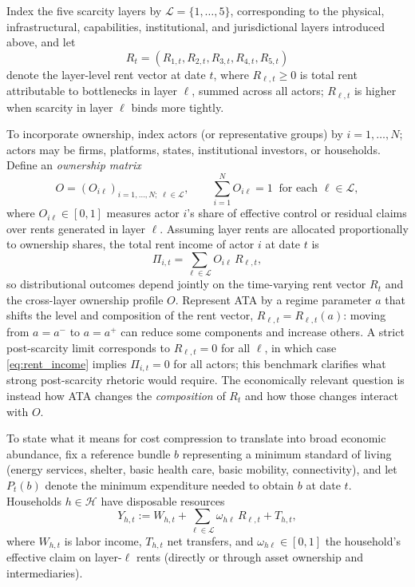 \documentclass[11pt]{article}
\begin{document}
Index the five scarcity layers by \(\mathcal{L}=\{1,\dots,5\}\), corresponding to the physical, infrastructural, capabilities, institutional, and jurisdictional layers introduced above, and let
\begin{equation}
R_t=(R_{1,t},R_{2,t},R_{3,t},R_{4,t},R_{5,t})
\label{eq:rent_vector}
\end{equation}
denote the layer-level rent vector at date \(t\), where \(R_{\ell,t}\ge 0\) is total rent attributable to bottlenecks in layer \(\ell\), summed across all actors; \(R_{\ell,t}\) is higher when scarcity in layer \(\ell\) binds more tightly.

To incorporate ownership, index actors (or representative groups) by \(i=1,\dots,N\); actors may be firms, platforms, states, institutional investors, or households. Define an \emph{ownership matrix}
\begin{equation}
O=(O_{i\ell})_{i=1,\dots,N;\;\ell\in\mathcal{L}},
\qquad
\sum_{i=1}^N O_{i\ell}=1 \ \text{ for each } \ell\in\mathcal{L},
\label{eq:ownership_matrix}
\end{equation}
where \(O_{i\ell}\in[0,1]\) measures actor \(i\)'s share of effective control or residual claims over rents generated in layer \(\ell\). Assuming layer rents are allocated proportionally to ownership shares, the total rent income of actor \(i\) at date \(t\) is
\begin{equation}
\Pi_{i,t}=\sum_{\ell\in\mathcal{L}} O_{i\ell}\,R_{\ell,t},
\label{eq:rent_income}
\end{equation}
so distributional outcomes depend jointly on the time-varying rent vector \(R_t\) and the cross-layer ownership profile \(O\). Represent ATA by a regime parameter \(a\) that shifts the level and composition of the rent vector, \(R_{\ell,t}=R_{\ell,t}(a)\): moving from \(a=a^-\) to \(a=a^+\) can reduce some components and increase others. A strict post-scarcity limit corresponds to \(R_{\ell,t}=0\) for all \(\ell\), in which case \eqref{eq:rent_income} implies \(\Pi_{i,t}=0\) for all actors; this benchmark clarifies what strong post-scarcity rhetoric would require. The economically relevant question is instead how ATA changes the \emph{composition} of \(R_t\) and how those changes interact with \(O\).

To state what it means for cost compression to translate into broad economic abundance, fix a reference bundle \(b\) representing a minimum standard of living (energy services, shelter, basic health care, basic mobility, connectivity), and let \(P_t(b)\) denote the minimum expenditure needed to obtain \(b\) at date \(t\). Households \(h\in\mathcal{H}\) have disposable resources
\begin{equation}
Y_{h,t}:=W_{h,t}+\sum_{\ell\in\mathcal{L}} \omega_{h\ell}\,R_{\ell,t}+T_{h,t},
\label{eq:household_resources}
\end{equation}
where \(W_{h,t}\) is labor income, \(T_{h,t}\) net transfers, and \(\omega_{h\ell}\in[0,1]\) the household's effective claim on layer-\(\ell\) rents (directly or through asset ownership and intermediaries).
\end{document}

